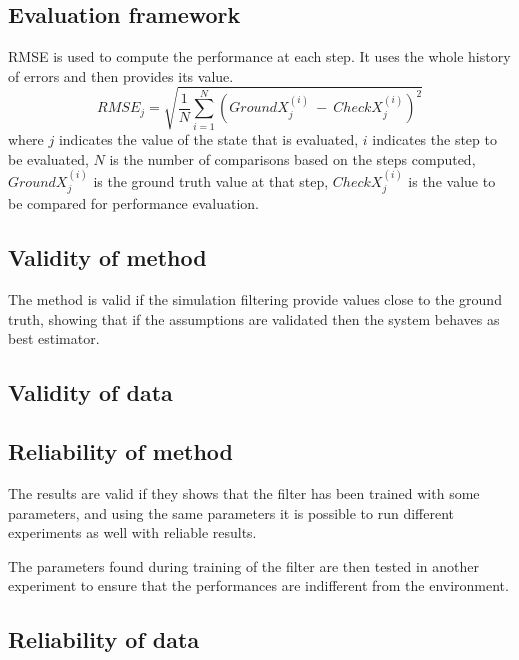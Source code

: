 \subsection{Evaluation framework}

\noindent \gls{RMSE} is used to compute the performance at each step.
It uses the whole history of errors and then provides its value.
\begin{equation}
    RMSE_j = \sqrt{ \frac{1}{N}\sum_{i=1}^{N} (GroundX_j^{(i)}~-~CheckX_j^{(i)})^2}
\end{equation}
where $j$ indicates the value of the state that is evaluated, $i$ indicates the step to be evaluated, $N$ is the number of comparisons based on the steps computed, $GroundX_j^{(i)}$ is the ground truth value at that step, $CheckX_j^{(i)}$ is the value to be compared for performance evaluation.


\subsection{Validity of method}
\noindent The method is valid if the simulation filtering provide values close to the ground truth, showing that if the assumptions are validated then the system behaves as best estimator.


\subsection{Validity of data}

\subsection{Reliability of method}
\noindent The results are valid if they shows that the filter has been trained with some parameters, and using the same parameters it is possible to run different experiments as well with reliable results.

The parameters found during training of the filter are then tested in another experiment to ensure that the performances are indifferent from the environment.


\subsection{Reliability of data}

\cleardoublepage
